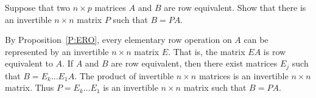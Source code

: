 \documentclass{ximera}
\begin{document}
\begin{exercise}  \label{c10.1.c8} 
Suppose that two $n\times p$ matrices $A$ and $B$ are row
equivalent.  Show that there is an invertible
$n\times n$ matrix $P$ such that $B = PA$.

\begin{solution}

By Proposition~\ref{P:ERO}, every
elementary row operation on $A$ can be represented by an invertible $n
\times n$ matrix $E$.  That is, the matrix $EA$ is row equivalent to
$A$.  If $A$ and $B$ are row equivalent, then there exist matrices
$E_j$ such that $B = E_k\ldots E_1A$.  The product of invertible $n
\times n$ matrices is an invertible $n \times n$ matrix.  Thus $P =
E_k\ldots E_1$ is an invertible $n \times n$ matrix such that $B =
PA$.

\end{solution}
\end{exercise}
\end{document}
